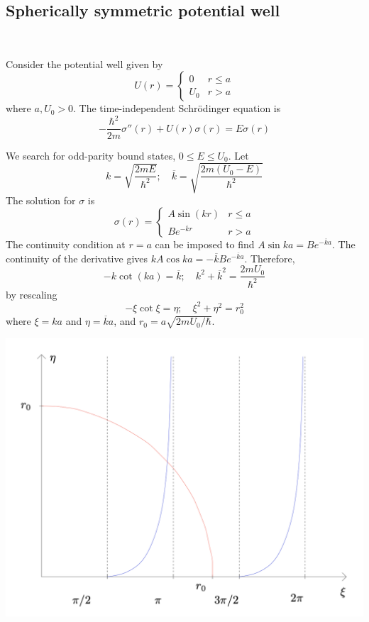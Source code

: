 \documentclass[a4paper]{article}
\begin{document}
\subsection{Spherically symmetric potential well}\ \vspace{-1.5em}
\begin{example}
	Consider the potential well given by
\[
	U(r) = \begin{cases}
		0   & r \leq a \\
		U_0 & r > a
	\end{cases}
\]
where \( a, U_0 > 0 \).
The time-independent Schr\"odinger equation is
\[
	-\frac{\hbar^2}{2m} \sigma''(r) + U(r) \sigma(r) = E \sigma(r)
\]
\end{example}
We search for odd-parity bound states, \( 0 \le E \le U_0 \).
Let
\[
	k = \sqrt{\frac{2mE}{\hbar^2}};\quad \overline k = \sqrt{\frac{2m(U_0 - E)}{\hbar^2}}
\]
The solution for \( \sigma \) is
\[
	\sigma(r) = \begin{cases}
		A \sin(kr)           & r \leq a \\
		B e^{-\overline k r} & r > a
	\end{cases}
\]
The continuity condition at \( r = a \) can be imposed to find \( A \sin ka = B e^{-\overline k a} \).
The continuity of the derivative gives \( kA \cos ka = -\overline k B e^{-\overline k a} \).
Therefore,
\[
	-k \cot(ka) = \overline k;\quad k^2 + \overline k^2 = \frac{2mU_0}{\hbar^2}
\]
by rescaling
\[
	-\xi \cot \xi = \eta; \quad \xi^2 + \eta^2 = r_0^2
\]
where \( \xi = ka \) and \( \eta = \overline k a \), and \( r_0 = a\sqrt{2mU_0/\hbar} \).
\begin{center}
	\includegraphics[scale=0.22]{qm12.png}
\end{center}
\end{document}
